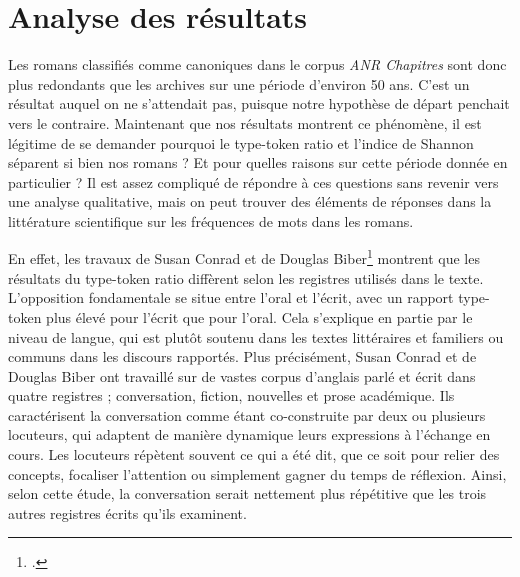 \documentclass[a4paper,twoside,12pt]{book}
\begin{document}
\section{Analyse des résultats}

Les romans classifiés comme canoniques dans le corpus \textit{ANR Chapitres} sont donc plus redondants que les archives sur une période d'environ 50 ans. C'est un résultat auquel on ne s'attendait pas, puisque notre hypothèse de départ penchait vers le contraire. Maintenant que nos résultats montrent ce phénomène, il est légitime de se demander pourquoi le type-token ratio et l'indice de Shannon séparent si bien nos romans ? Et pour quelles raisons sur cette période donnée en particulier ? Il est assez compliqué de répondre à ces questions sans revenir vers une analyse qualitative, mais on peut trouver des éléments de réponses dans la littérature scientifique sur les fréquences de mots dans les romans.

En effet, les travaux de Susan Conrad et de Douglas Biber\footcites{biber_register_2019} montrent que les résultats du type-token ratio diffèrent selon les registres utilisés dans le texte. L'opposition fondamentale se situe entre l'oral et l'écrit, avec un rapport type-token plus élevé pour l'écrit que pour l'oral. Cela s'explique en partie par le niveau de langue, qui est plutôt soutenu dans les textes littéraires et familiers ou communs dans les discours rapportés. Plus précisément, Susan Conrad et de Douglas Biber ont travaillé sur de vastes corpus d'anglais parlé et écrit dans quatre registres ; conversation, fiction, nouvelles et prose académique. Ils caractérisent la conversation comme étant co-construite par deux ou plusieurs locuteurs, qui adaptent de manière dynamique leurs expressions à l'échange en cours. Les locuteurs répètent souvent ce qui a été dit, que ce soit pour relier des concepts, focaliser l'attention ou simplement gagner du temps de réflexion. Ainsi, selon cette étude, la conversation serait nettement plus répétitive que les trois autres registres écrits qu'ils examinent.
\end{document}
